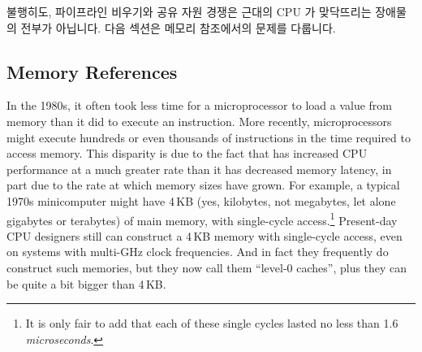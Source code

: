 불행히도, 파이프라인 비우기와 공유 자원 경쟁은 근대의 CPU 가 맞닥뜨리는
장애물의 전부가 아닙니다.
다음 섹션은 메모리 참조에서의 문제를 다룹니다.

\subsection{Memory References}
\label{sec:cpu:Memory References}

In the 1980s, it often took less time for a microprocessor to load a value
from memory than it did to execute an instruction.
More recently, microprocessors might execute hundreds or even thousands
of instructions in the time required to access memory.
This disparity is due to the fact that  has increased CPU
performance at a much greater rate than it has decreased memory latency,
in part due to the rate at which memory sizes have grown.
For example, a typical 1970s minicomputer might have 4\,KB (yes, kilobytes,
not megabytes, let alone gigabytes or terabytes) of main memory, with
single-cycle access.\footnote{
	It is only fair to add that each of these single cycles
	lasted no less than 1.6 \emph{microseconds}.}
Present-day CPU designers still can construct a 4\,KB memory with single-cycle
access, even on systems with multi-GHz clock frequencies.
And in fact they frequently do construct such memories, but they now
call them ``level-0 caches'', plus they can be quite a bit bigger than 4\,KB.

